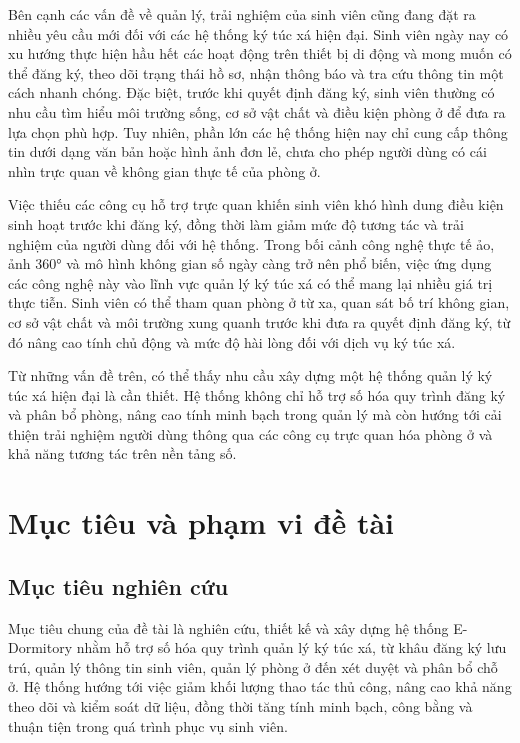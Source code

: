 \documentclass[../DoAn.tex]{subfiles}
\begin{document}
Bên cạnh các vấn đề về quản lý, trải nghiệm của sinh viên cũng đang đặt ra nhiều yêu cầu mới đối với các hệ thống ký túc xá hiện đại. Sinh viên ngày nay có xu hướng thực hiện hầu hết các hoạt động trên thiết bị di động và mong muốn có thể đăng ký, theo dõi trạng thái hồ sơ, nhận thông báo và tra cứu thông tin một cách nhanh chóng. Đặc biệt, trước khi quyết định đăng ký, sinh viên thường có nhu cầu tìm hiểu môi trường sống, cơ sở vật chất và điều kiện phòng ở để đưa ra lựa chọn phù hợp. Tuy nhiên, phần lớn các hệ thống hiện nay chỉ cung cấp thông tin dưới dạng văn bản hoặc hình ảnh đơn lẻ, chưa cho phép người dùng có cái nhìn trực quan về không gian thực tế của phòng ở.

Việc thiếu các công cụ hỗ trợ trực quan khiến sinh viên khó hình dung điều kiện sinh hoạt trước khi đăng ký, đồng thời làm giảm mức độ tương tác và trải nghiệm của người dùng đối với hệ thống. Trong bối cảnh công nghệ thực tế ảo, ảnh 360° và mô hình không gian số ngày càng trở nên phổ biến, việc ứng dụng các công nghệ này vào lĩnh vực quản lý ký túc xá có thể mang lại nhiều giá trị thực tiễn. Sinh viên có thể tham quan phòng ở từ xa, quan sát bố trí không gian, cơ sở vật chất và môi trường xung quanh trước khi đưa ra quyết định đăng ký, từ đó nâng cao tính chủ động và mức độ hài lòng đối với dịch vụ ký túc xá.

Từ những vấn đề trên, có thể thấy nhu cầu xây dựng một hệ thống quản lý ký túc xá hiện đại là cần thiết. Hệ thống không chỉ hỗ trợ số hóa quy trình đăng ký và phân bổ phòng, nâng cao tính minh bạch trong quản lý mà còn hướng tới cải thiện trải nghiệm người dùng thông qua các công cụ trực quan hóa phòng ở và khả năng tương tác trên nền tảng số. 


\section{Mục tiêu và phạm vi đề tài}
\label{section:1.2}

\subsection{Mục tiêu nghiên cứu}

Mục tiêu chung của đề tài là nghiên cứu, thiết kế và xây dựng hệ thống E-Dormitory nhằm hỗ trợ số hóa quy trình quản lý ký túc xá, từ khâu đăng ký lưu trú, quản lý thông tin sinh viên, quản lý phòng ở đến xét duyệt và phân bổ chỗ ở. Hệ thống hướng tới việc giảm khối lượng thao tác thủ công, nâng cao khả năng theo dõi và kiểm soát dữ liệu, đồng thời tăng tính minh bạch, công bằng và thuận tiện trong quá trình phục vụ sinh viên.
\end{document}
